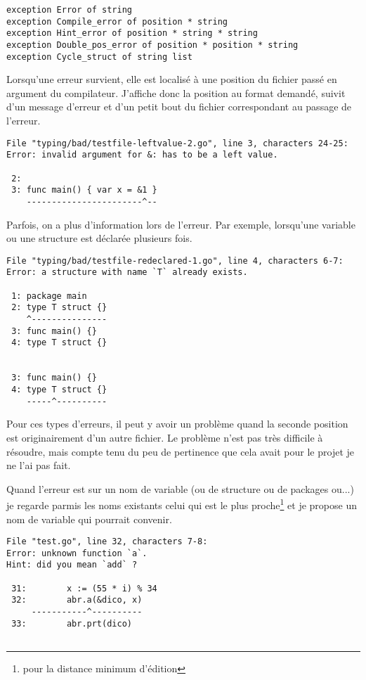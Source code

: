\documentclass[11pt]{article}
\begin{document}
\begin{verbatim}
exception Error of string
exception Compile_error of position * string
exception Hint_error of position * string * string
exception Double_pos_error of position * position * string
exception Cycle_struct of string list
\end{verbatim}

Lorsqu'une erreur survient, elle est localisé à une position du fichier passé en argument du compilateur. J'affiche donc la position au format demandé, suivit d'un message d'erreur et d'un petit bout du fichier correspondant au passage de l'erreur.

\begin{verbatim}
File "typing/bad/testfile-leftvalue-2.go", line 3, characters 24-25:
Error: invalid argument for &: has to be a left value.

 2:
 3: func main() { var x = &1 }
    -----------------------^--
\end{verbatim}

Parfois, on a plus d'information lors de l'erreur. Par exemple, lorsqu'une variable ou une structure est déclarée plusieurs fois.

\begin{verbatim}
File "typing/bad/testfile-redeclared-1.go", line 4, characters 6-7:
Error: a structure with name `T` already exists.

 1: package main
 2: type T struct {}
    ^---------------
 3: func main() {}
 4: type T struct {}


 3: func main() {}
 4: type T struct {}
    -----^----------
\end{verbatim}

Pour ces types d'erreurs, il peut y avoir un problème quand la seconde position est originairement d'un autre fichier. Le problème n'est pas très difficile à résoudre, mais compte tenu du peu de pertinence que cela avait pour le projet je ne l'ai pas fait.

Quand l'erreur est sur un nom de variable (ou de structure ou de packages ou...) je regarde parmis les noms existants celui qui est le plus proche\footnote{pour la distance minimum d'édition} et je propose un nom de variable qui pourrait convenir.

\begin{verbatim}
File "test.go", line 32, characters 7-8:
Error: unknown function `a`.
Hint: did you mean `add` ?

 31:        x := (55 * i) % 34
 32:        abr.a(&dico, x)
     -----------^----------
 33:        abr.prt(dico)


\end{verbatim}
\end{document}
